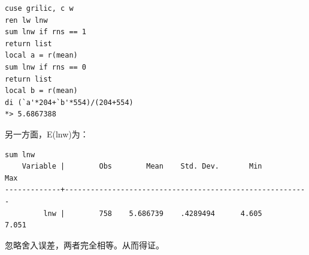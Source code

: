 \begin{lstlisting}
cuse grilic, c w
ren lw lnw
sum lnw if rns == 1
return list
local a = r(mean)
sum lnw if rns == 0
return list
local b = r(mean)
di (`a'*204+`b'*554)/(204+554)
*> 5.6867388
\end{lstlisting}

另一方面，E(lnw)为：

\begin{lstlisting}
sum lnw
    Variable |        Obs        Mean    Std. Dev.       Min        Max
-------------+---------------------------------------------------------
         lnw |        758    5.686739    .4289494      4.605      7.051
\end{lstlisting}

忽略舍入误差，两者完全相等。从而得证。
